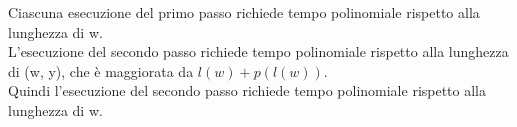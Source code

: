 Ciascuna esecuzione del primo passo richiede tempo polinomiale rispetto alla lunghezza di w.\\
L’esecuzione del secondo passo richiede tempo polinomiale rispetto alla
lunghezza di (w, y), che è maggiorata da $l(w) + p(l(w))$.\\
Quindi l’esecuzione del secondo passo richiede tempo polinomiale rispetto
alla lunghezza di w.





